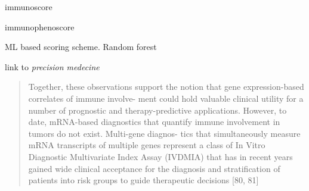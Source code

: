 \documentclass[12pt,]{book}
\theoremstyle{definition}
\theoremstyle{definition}
\theoremstyle{definition}
\theoremstyle{remark}
\begin{document}
immunoscore

immunophenoscore

ML based scoring scheme. Random forest

link to \emph{precision medecine}

\begin{quote}
Together, these observations support the notion that gene
expression-based correlates of immune involve- ment could hold valuable
clinical utility for a number of prognostic and therapy-predictive
applications. However, to date, mRNA-based diagnostics that quantify
immune involvement in tumors do not exist. Multi-gene diagnos- tics that
simultaneously measure mRNA transcripts of multiple genes represent a
class of In Vitro Diagnostic Multivariate Index Assay (IVDMIA) that has
in recent years gained wide clinical acceptance for the diagnosis and
stratification of patients into risk groups to guide therapeutic
decisions {[}80, 81{]}
\end{quote}
\end{document}
